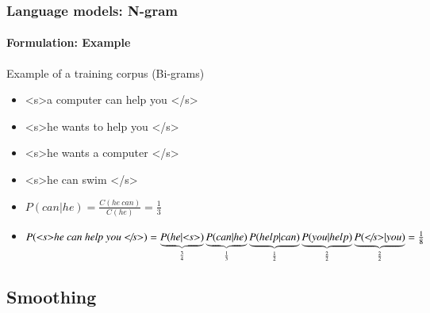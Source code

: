 \documentclass[xcolor=table]{beamer}
\begin{document}
\begin{frame}
\frametitle{Language models: N-gram}
\framesubtitle{Formulation: Example}

\begin{exampleblock}{Example of a training corpus (Bi-grams)}
	\begin{itemize}
		\item \textless s\textgreater a computer can help you \textless/s\textgreater
		\item \textless s\textgreater he wants to help you \textless/s\textgreater
		\item \textless s\textgreater he wants a computer \textless/s\textgreater
		\item \textless s\textgreater he can swim \textless/s\textgreater
	\end{itemize}
\end{exampleblock}

\begin{itemize}
	\item $P(can | he) = \frac{C(he\ can)}{C(he)} = \frac{1}{3}$
	\item $P(\text{\textit{\textless s\textgreater he can help you \textless/s\textgreater}}) = 
	\underbrace{P(he|\text{\textit{\textless s\textgreater}})}_{\frac{3}{4}}
	\underbrace{P(can|he)}_{\frac{1}{3}} 
	\underbrace{P(help|can)}_{\frac{1}{2}} 
	\underbrace{P(you|help)}_{\frac{2}{2}}
	\underbrace{P(\text{\textit{\textless/s\textgreater}}|you)}_{\frac{2}{2}} = 
	\frac{1}{8}
	$
\end{itemize}


\end{frame}

\subsection{Smoothing}
\end{document}
